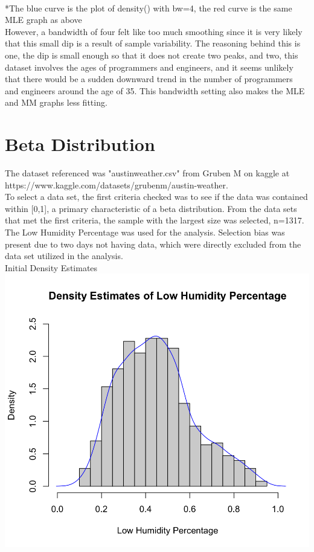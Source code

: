 \documentclass[12pt, letterpaper]{article}
\begin{document}
\footnotesize
\\ \**The blue curve is the plot of density() with bw=4, the red curve is the same MLE graph as above \\
\normalsize
However, a bandwidth of four felt like too much smoothing since it is very likely that this small dip is a result of sample variability. The reasoning behind this is one, the dip is small enough so that it does not create two peaks, and two, this dataset involves the ages of programmers and engineers, and it seems unlikely that there would be a sudden downward trend in the number of programmers and engineers around the age of 35. This bandwidth setting also makes the MLE and MM graphs less fitting.

\newpage
\noindent
\section*{Beta Distribution}
\normalsize
The dataset referenced was "austinweather.csv" from Gruben M on kaggle at \\ https://www.kaggle.com/datasets/grubenm/austin-weather. \\
To select a data set, the first criteria checked was to see if the data was contained within [0,1], a primary characteristic of a beta distribution. From the data sets that met the first criteria, the sample with the largest size was selected, n=1317. The Low Humidity Percentage was used for the analysis. Selection bias was present due to two days not having data, which were directly excluded from the data set utilized in the analysis.
\\[0.5\baselineskip]
Initial Density Estimates\\
\includegraphics[scale=0.40]{austinweather_densityestimates.png}
\end{document}
